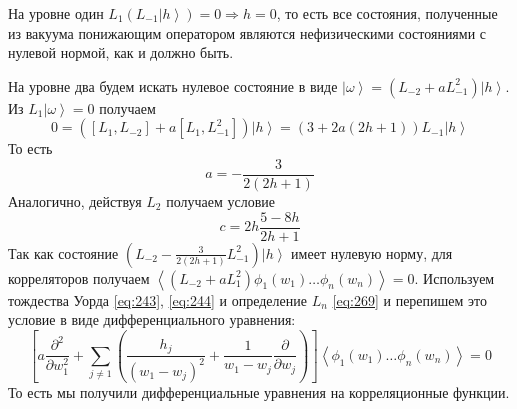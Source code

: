 \documentclass[a4paper,12pt]{article} \usepackage[utf8x]{inputenc} \usepackage[russian]{babel}
\theoremstyle{definition} \newtheorem{corollary}{Corollary}[theorem] \theoremstyle{definition}
\begin{document}
На уровне один $L_{1}\left(L_{-1}\left|h\right>\right)=0\Longrightarrow h=0$, то есть все состояния,
полученные из вакуума понижающим оператором являются нефизическими состояниями с нулевой нормой, как
и должно быть.

На уровне два будем искать нулевое состояние в виде $\left|\omega\right>=(L_{-2}+a L_{-1}^{2})\left|
h \right> $. Из $L_{1}\left|\omega\right>=0$ получаем
\begin{equation}
  \label{eq:310} 0=([L_{1},L_{-2}] +a [L_{1},L_{-1}^{2}])\left|h\right> =
(3+2a(2h+1))L_{-1}\left|h\right>
\end{equation} То есть
\begin{equation}
  \label{eq:311} a=-\frac{3}{2(2h+1)}
\end{equation} Аналогично, действуя $L_{2}$ получаем условие
\begin{equation}
  \label{eq:312} c=2h\frac{5-8h}{2h+1}
\end{equation} Так как состояние $(L_{-2}-\frac{3}{2(2h+1)} L_{-1}^{2})\left|h\right>$ имеет нулевую
норму, для корреляторов получаем $\left<(L_{-2}+aL_{1}^{2})\phi_{1}(w_{1}) \dots \phi_{n}(w_{n})
\right>=0$. Используем тождества Уорда \eqref{eq:243}, \eqref{eq:244} и определение $L_{n}$
\eqref{eq:269} и перепишем это условие в виде дифференциального уравнения:
\begin{equation}
  \label{eq:313} \left[ a \frac{\partial^{2}}{\partial w_{1}^{2}} +\sum_{j\neq 1}
\left(\frac{h_{j}}{(w_{1}-w_{j})^{2}}+\frac{1}{w_{1}-w_{j}} \frac{\partial}{\partial
w_{j}}\right)\right] \left< \phi_{1}(w_{1}) \dots \phi_{n}(w_{n}) \right> =0
\end{equation} То есть мы получили дифференциальные уравнения на корреляционные функции.
\end{document}
